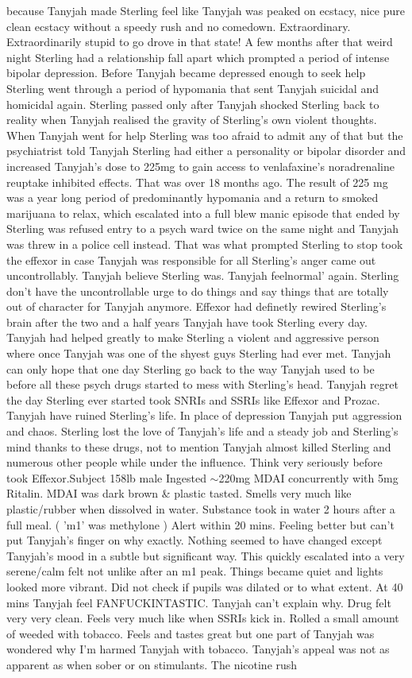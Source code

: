 \documentclass[12pt]{book}
\begin{document}
because Tanyjah made Sterling feel like Tanyjah was peaked on ecstacy, nice pure clean ecstacy without a speedy rush and no comedown. Extraordinary. Extraordinarily stupid to go drove in that state! A few months after that weird night Sterling had a relationship fall apart which prompted a period of intense bipolar depression. Before Tanyjah became depressed enough to seek help Sterling went through a period of hypomania that sent Tanyjah suicidal and homicidal again. Sterling passed only after Tanyjah shocked Sterling back to reality when Tanyjah realised the gravity of Sterling's own violent thoughts. When Tanyjah went for help Sterling was too afraid to admit any of that but the psychiatrist told Tanyjah Sterling had either a personality or bipolar disorder and increased Tanyjah's dose to 225mg to gain access to venlafaxine's noradrenaline reuptake inhibited effects. That was over 18 months ago. The result of 225 mg was a year long period of predominantly hypomania and a return to smoked marijuana to relax, which escalated into a full blew manic episode that ended by Sterling was refused entry to a psych ward twice on the same night and Tanyjah was threw in a police cell instead. That was what prompted Sterling to stop took the effexor in case Tanyjah was responsible for all Sterling's anger came out uncontrollably. Tanyjah believe Sterling was. Tanyjah feelnormal' again. Sterling don't have the uncontrollable urge to do things and say things that are totally out of character for Tanyjah anymore. Effexor had definetly rewired Sterling's brain after the two and a half years Tanyjah have took Sterling every day. Tanyjah had helped greatly to make Sterling a violent and aggressive person where once Tanyjah was one of the shyest guys Sterling had ever met. Tanyjah can only hope that one day Sterling go back to the way Tanyjah used to be before all these psych drugs started to mess with Sterling's head. Tanyjah regret the day Sterling ever started took SNRIs and SSRIs like Effexor and Prozac. Tanyjah have ruined Sterling's life. In place of depression Tanyjah put aggression and chaos. Sterling lost the love of Tanyjah's life and a steady job and Sterling's mind thanks to these drugs, not to mention Tanyjah almost killed Sterling and numerous other people while under the influence. Think very seriously before took Effexor.Subject 158lb male Ingested $\sim$220mg MDAI concurrently with 5mg Ritalin. MDAI was dark brown \& plastic tasted. Smells very much like plastic/rubber when dissolved in water. Substance took in water 2 hours after a full meal. ( 'm1' was methylone ) Alert within 20 mins. Feeling better but can't put Tanyjah's finger on why exactly. Nothing seemed to have changed except Tanyjah's mood in a subtle but significant way. This quickly escalated into a very serene/calm felt not unlike after an m1 peak. Things became quiet and lights looked more vibrant. Did not check if pupils was dilated or to what extent. At 40 mins Tanyjah feel FANFUCKINTASTIC. Tanyjah can't explain why. Drug felt very very clean. Feels very much like when SSRIs kick in. Rolled a small amount of weeded with tobacco. Feels and tastes great but one part of Tanyjah was wondered why I'm harmed Tanyjah with tobacco. Tanyjah's appeal was not as apparent as when sober or on stimulants. The nicotine rush 
\end{document}
